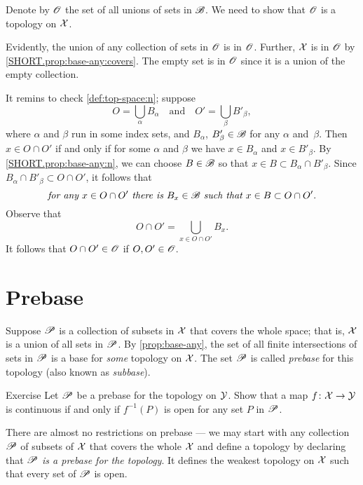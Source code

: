 Denote by $\mathscr{O}$ the set of all unions of sets in $\mathscr{B}$.
We need to show that $\mathscr{O}$ is a topology on $\mathcal{X}$.

Evidently, the union of any collection of sets in $\mathscr{O}$ is in $\mathscr{O}$.
Further, $\mathcal{X}$ is in $\mathscr{O}$ by \ref{SHORT.prop:base-any:covers}.
The empty set is in $\mathscr{O}$ since it is a union of the empty collection.

It remins to check \ref{def:top-space:n}; suppose 
\[O=\bigcup_\alpha B_\alpha
\quad\text{and}\quad
O'=\bigcup_\beta B'_\beta,
\]
where $\alpha$ and $\beta$ run in some index sets, and $B_\alpha$, $B'_\beta\in \mathscr{B}$ for any $\alpha$ and~$\beta$.
Then $x\in O\cap O'$ if and only if for some $\alpha$ and $\beta$ we have $x\in B_\alpha$ and $x\in B'_\beta$.
By \ref{SHORT.prop:base-any:n}, we can choose $B\in \mathscr{B}$ so that $x\in B\subset B_\alpha \cap B'_\beta$.
Since $B_\alpha \cap B'_\beta\subset O\cap O'$, it follows that 
\[\textit{for any $x\in O\cap O'$ there is $B_x\in\mathscr{B}$ such that 
$x\in B\subset O\cap O'$.}\]
Observe that 
\[O\cap O'=\bigcup_{x\in O\cap O'} B_x.\]
It follows that $O\cap O'\in\mathscr{O}$ if $O,O'\in\mathscr{O}$.
\qeds

\section{Prebase}\label{prebase}

Suppose $\mathscr{P}$ is a collection of subsets in $\mathcal{X}$ that covers the whole space;
that is, $\mathcal{X}$ is a union of all sets in $\mathscr{P}$.
By \ref{prop:base-any}, the set of all finite intersections of sets in $\mathscr{P}$ is a base for \textit{some} topology on $\mathcal{X}$.
The set $\mathscr{P}$ is called \emph{prebase} for this topology (also known as \emph{subbase}).

\begin{thm}{Exercise}\label{ex:prebase}
Let $\mathscr{P}$ be a prebase for the topology on $\mathcal{Y}$.
Show that a map $f\colon \mathcal{X} \to \mathcal{Y}$ is continuous if and only if $f^{-1}(P)$ is open for any set $P$ in $\mathscr{P}$.

\end{thm}

There are almost no restrictions on prebase --- we may start with any collection $\mathscr{P}$ of subsets of $\mathcal{X}$ that covers the whole $\mathcal{X}$ and define a topology by declaring that \textit{$\mathscr{P}$ is a prebase for the topology}.
It defines the weakest topology on $\mathcal{X}$ such that every set of $\mathscr{P}$ is open.

